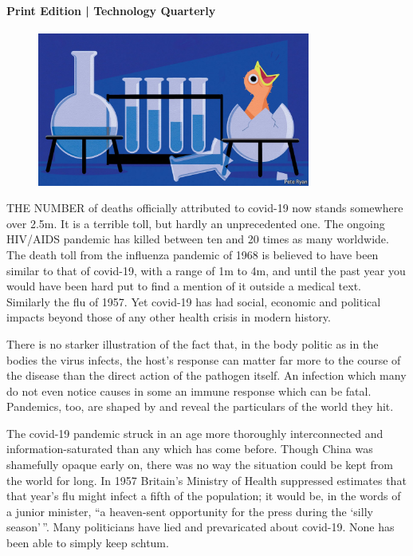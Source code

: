 \documentclass{article}
\begin{document}
\paragraph{Print Edition | Technology Quarterly  \quad \color{gray}{Mar 23rd 2021 }}
\begin{figure}[h]
\centering
\includegraphics[width=0.8\textwidth]{images/20210327_tqd001.jpg}
\end{figure}
\lettrine{T}HE NUMBER of deaths officially attributed to covid-19 now stands somewhere over 2.5m. It is a terrible toll, but hardly an unprecedented one. The ongoing HIV/AIDS pandemic has killed between ten and 20 times as many worldwide. The death toll from the influenza pandemic of 1968 is believed to have been similar to that of covid-19, with a range of 1m to 4m, and until the past year you would have been hard put to find a mention of it outside a medical text. Similarly the flu of 1957. Yet covid-19 has had social, economic and political impacts beyond those of any other health crisis in modern history. 

There is no starker illustration of the fact that, in the body politic as in the bodies the virus infects, the host's response can matter far more to the course of the disease than the direct action of the pathogen itself. An infection which many do not even notice causes in some an immune response which can be fatal. Pandemics, too, are shaped by and reveal the particulars of the world they hit. 

The covid-19 pandemic struck in an age more thoroughly interconnected and information-saturated than any which has come before. Though China was shamefully opaque early on, there was no way the situation could be kept from the world for long. In 1957 Britain's Ministry of Health suppressed estimates that that year's flu might infect a fifth of the population; it would be, in the words of a junior minister, ``a heaven-sent opportunity for the press during the `silly season'\,''. Many politicians have lied and prevaricated about covid-19. None has been able to simply keep schtum. 
\end{document}
